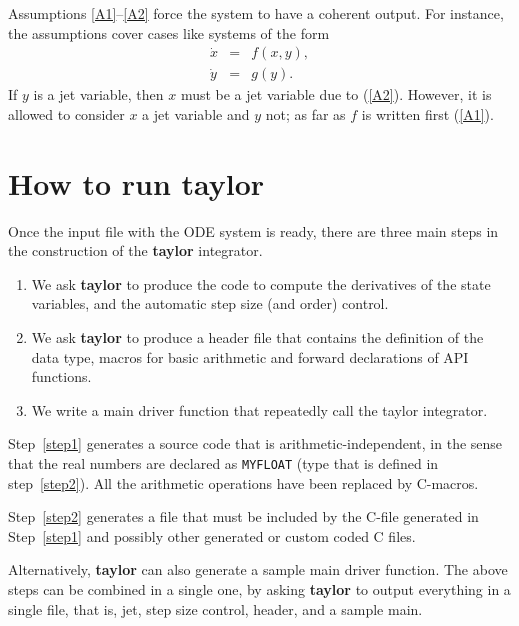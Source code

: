 \documentclass[10pt]{article}
\theoremstyle{remark}
\newcommand{\taylorname}{{\bf taylor}}
\newcommand{\myfloat}{{\tt MY\symbol{95}FLOAT}}
\begin{document}
Assumptions \ref{A1}--\ref{A2} force the system to have a coherent
output. For instance, the assumptions cover cases like systems of the
form
\begin{eqnarray*}
    \dot x &=& f(x,y), \\
    \dot y &=& g(y).
\end{eqnarray*}
If $y$ is a jet variable, then $x$ must be a jet variable due to
(\ref{A2}). However, it is allowed to consider $x$ a jet variable and
$y$ not; as far as $f$ is written first (\ref{A1}).

\section{How to run \taylorname{}}

Once the input file with the ODE system is ready, there are three main
steps in the construction of the \taylorname{} integrator.

\begin{enumerate}
\renewcommand{\theenumi}{\arabic{enumi}}
\renewcommand{\labelenumi}{\theenumi.)}
    \item\label{step1} We ask \taylorname{} to produce the code to
      compute the derivatives of the state variables, and the
      automatic step size (and order) control.
    \item\label{step2} We ask \taylorname{} to produce a header file
      that contains the definition of the data type, macros for basic
      arithmetic and forward declarations of API functions.
    \item\label{step3} We write a main driver function that repeatedly
      call the taylor integrator.
\end{enumerate}
Step~\ref{step1} generates a source code that is
arithmetic-independent, in the sense that the real numbers are
declared as \myfloat{} (type that is defined in step~\ref{step2}). All
the arithmetic operations have been replaced by C-macros. 

\smallskip

Step~\ref{step2} generates a file that must be included by the C-file
generated in Step~\ref{step1} and possibly other generated or custom
coded C files.

\medskip

Alternatively, \taylorname{} can also generate a sample main driver
function.  The above steps can be combined in a single one, by asking
\taylorname{} to output everything in a single file, that is, jet,
step size control, header, and a sample main.
\end{document}
